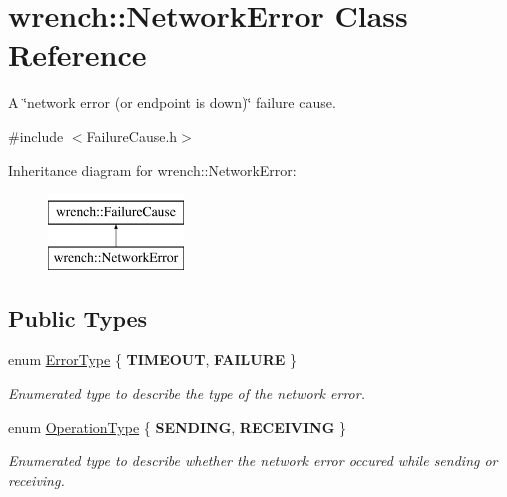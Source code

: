 \hypertarget{classwrench_1_1_network_error}{}\section{wrench\+:\+:Network\+Error Class Reference}
\label{classwrench_1_1_network_error}


A \char`\"{}network error (or endpoint is down)\char`\"{} failure cause.  




{\ttfamily \#include $<$Failure\+Cause.\+h$>$}

Inheritance diagram for wrench\+:\+:Network\+Error\+:\begin{figure}[H]
\begin{center}
\leavevmode
\includegraphics[height=2.000000cm]{classwrench_1_1_network_error}
\end{center}
\end{figure}
\subsection*{Public Types}
\begin{DoxyCompactItemize}
\item 
\mbox{\label{classwrench_1_1_network_error_a17ec7046bb91ea4e909c3bf59d46f09b}} 
enum \hyperlink{classwrench_1_1_network_error_a17ec7046bb91ea4e909c3bf59d46f09b}{Error\+Type} \{ {\bfseries T\+I\+M\+E\+O\+UT}, 
{\bfseries F\+A\+I\+L\+U\+RE}
 \}\begin{DoxyCompactList}\small\item\em Enumerated type to describe the type of the network error. \end{DoxyCompactList}
\item 
\mbox{\label{classwrench_1_1_network_error_a18331f823c565c53be139bdac90437d8}} 
enum \hyperlink{classwrench_1_1_network_error_a18331f823c565c53be139bdac90437d8}{Operation\+Type} \{ {\bfseries S\+E\+N\+D\+I\+NG}, 
{\bfseries R\+E\+C\+E\+I\+V\+I\+NG}
 \}\begin{DoxyCompactList}\small\item\em Enumerated type to describe whether the network error occured while sending or receiving. \end{DoxyCompactList}
\end{DoxyCompactItemize}

